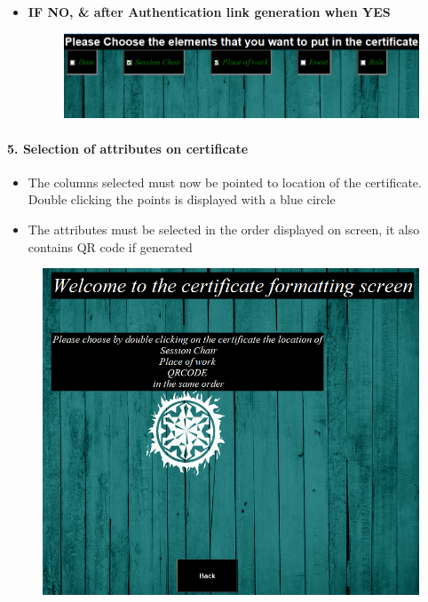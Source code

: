 \begin{itemize}
	\item \large\textbf{IF NO, \& after Authentication link generation when YES}
	
\begin{figure}[H]
	\centering
	\includegraphics[width=0.7\linewidth]{"images/generation_qr_nqr/Screenshot (41)"}
	\label{fig:screenshot-41}
\end{figure}


\end{itemize}

\newpage
\paragraph{5. Selection of attributes on certificate}

\begin{itemize}
	\item The columns selected must now be pointed to location of the certificate. Double clicking the points is displayed with a blue circle
	\item The attributes must be selected in the order displayed on screen, it also contains QR code if generated
\end{itemize}

\begin{figure}[H]
	\centering
	\includegraphics[width=0.65\linewidth]{"images/generation_qr_nqr/Screenshot (56)"}
	\label{fig:screenshot-56}
\end{figure}


